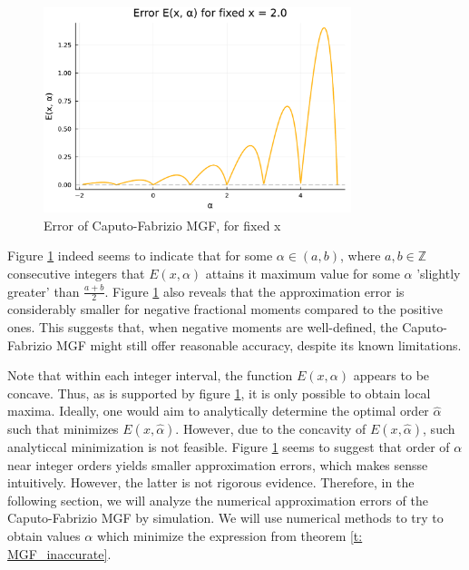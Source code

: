 \begin{figure}[H]
    \centering
    \includegraphics[width=0.8\textwidth]{figures/error_plot_fixed_x.pdf}
    \caption{Error of Caputo-Fabrizio MGF, for fixed x}
    \label{fig:error_MGF_fixed_x}
\end{figure}
Figure \ref{fig:error_MGF_fixed_x} indeed seems to indicate that for some \(\alpha \in (a, b)\), where \(a, b \in \mathbb{Z}\) consecutive integers that \(E(x, \alpha)\) attains it maximum value for some \(\alpha\) 'slightly greater' than \(\frac{a + b}{2}\). Figure \ref{fig:error_MGF_fixed_x} also reveals that the approximation error is considerably smaller for negative fractional moments compared to the positive ones. This suggests that, when negative moments are well-defined, the Caputo-Fabrizio MGF might still offer reasonable accuracy, despite its known limitations.

Note that within each integer interval, the function \(E(x, \alpha)\) appears to be concave. Thus, as is supported by figure \ref{fig:error_MGF_fixed_x}, it is only possible to obtain local maxima. Ideally, one would aim to analytically determine the optimal order \(\hat{\alpha}\) such that minimizes \(E(x, \hat{\alpha})\). However, due to the concavity of \(E(x, \hat{\alpha})\), such analyticcal minimization is not feasible. Figure \ref{fig:error_MGF_fixed_x} seems to suggest that order of \(\alpha\) near integer orders yields smaller approximation errors, which makes sensse intuitively. However, the latter is not rigorous evidence. Therefore, in the following section, we will analyze the numerical approximation errors of the Caputo-Fabrizio MGF by simulation. We will use numerical methods to try to obtain values \(\alpha\) which minimize the expression from theorem \ref{t: MGF_inaccurate}.
